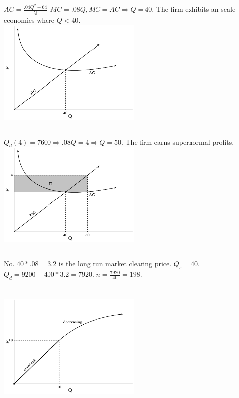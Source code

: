 \documentclass{article}
\begin{document}
	\subsection[b]{}
		$ AC = \frac{.04Q^2+64}{Q}, MC = .08Q, MC = AC \Rightarrow Q=40.$ The firm exhibits an scale economies where $ Q < 40 $. \\
		\includegraphics[height=2in]{Charts/4b}
	\subsection[c]{}
		$ Q_d(4) = 7600 \Rightarrow .08Q = 4 \Rightarrow Q=50. $ The firm earns supernormal profits. \\
		\includegraphics[height=2in]{Charts/4c}
	\subsection[d]{}
		No. $40*.08 = 3.2$ is the long run market clearing price. $Q_s = 40$. $Q_d = 9200-400 * 3.2 = 7920.$ $ n = \frac{7920}{40} = 198. $
\section[5]{}
	\subsection[a]{}
		\includegraphics[height=2in]{Charts/5a}
\end{document}
